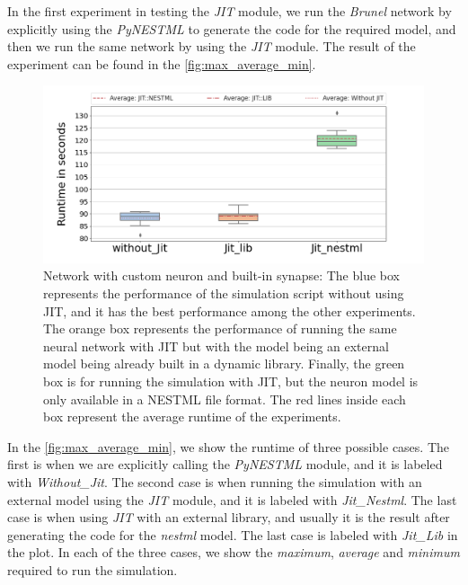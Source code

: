 In the first experiment in testing the \emph{JIT} module, we run the \emph{Brunel} network by explicitly using the \emph{PyNESTML} to generate the code for the required model, and then we run the same network by using the \emph{JIT} module. The result of the experiment can be found in the \autoref{fig:max_average_min}.

\begin{figure}[ht!]
    \centering
    \includegraphics[width=\textwidth]{src/pic/box_plot_three.png}
    \caption{Network with custom neuron and built-in synapse: The blue box represents the performance of the simulation script without using JIT, and it has the best performance among the other experiments. The orange box represents the performance of running the same neural network with JIT but with the model being an external model being already built in a dynamic library. Finally, the green box is for running the simulation with JIT, but the neuron model is only available in a NESTML file format. The red lines inside each box represent the average runtime of the experiments.}
    \label{fig:max_average_min}
\end{figure}

In the \autoref{fig:max_average_min}, we show the runtime of three possible cases. The first is when we are explicitly calling the \emph{PyNESTML} module, and it is labeled with \emph{Without\_Jit}. The second case is when running the simulation with an external model using the \emph{JIT} module, and it is labeled with \emph{Jit\_Nestml}. The last case is when using \emph{JIT} with an external library, and usually it is the result after generating the code for the \emph{nestml} model. The last case is labeled with \emph{Jit\_Lib} in the plot. In each of the three cases, we show the \emph{maximum}, \emph{average} and \emph{minimum} required to run the simulation.

